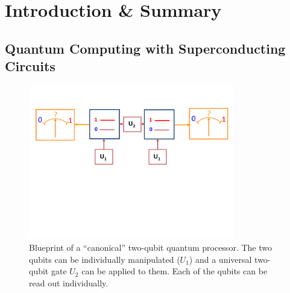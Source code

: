 \chapter{Introduction \& Summary}

\pagestyle{fancy}
\setcounter{page}{9}


\section{Quantum Computing with Superconducting Circuits} \label{section:divincenzo_criteria}

%
\begin{figure}
\centering \includegraphics[width=0.8\textwidth]{./material/papers/grover/submission1/Fig1}
\caption[Blueprint of a {}``canonical'' two-qubit quantum processor]{Blueprint of a {}``canonical'' two-qubit quantum processor. The two qubits can be individually manipulated ($U_{1}$) and
a universal two-qubit gate $U_{2}$ can be applied to them. Each of
the qubits can be read out individually.}


\label{fig:qubit_processor_blueprint} %
\end{figure}


